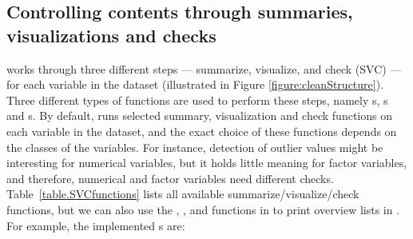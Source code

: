 \documentclass[article,shortnames]{jss}
\begin{document}
\subsection{Controlling contents through summaries, visualizations and checks}

 works through three different steps --- summarize,
visualize, and check (SVC) --- for each variable in the dataset
(illustrated in Figure \ref{figure:cleanStructure}).  Three different
types of functions are used to perform these steps, namely
s, s and
s.  By default,  runs
selected summary, visualization and check functions on each variable
in the dataset, and the exact choice of these functions depends on the
classes of the variables. For instance, detection of outlier values
might be interesting for numerical variables, but it holds little
meaning for factor variables, and therefore, numerical and factor
variables need different checks. Table~\ref{table.SVCfunctions} lists
all available summarize/visualize/check functions, but we can also use
the , , and
 functions in  to print
overview lists in . For example, the implemented
s are:

\end{document}

